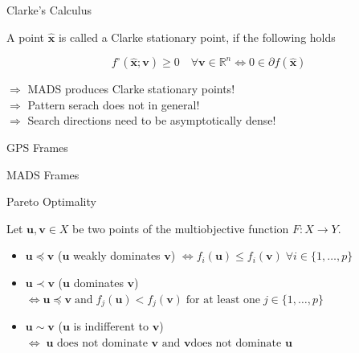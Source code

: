\documentclass[aspectratio=43,t]{beamer}
\renewcommand{\vec}[1]{\mathbf{#1}}
\begin{document}
	\begin{frame}[fragile]{Clarke's Calculus}
		\begin{definition}
        \label{def:stationary_clarke}
        A point $\vec{\hat{x}}$ is called a Clarke stationary point,
        if the following holds
        
        \begin{equation}
            f^{\circ}(\vec{\hat{x}}; \vec{v}) \geq 0 \quad \forall
             \vec{v} \in \mathbb{R}^n
            \Longleftrightarrow
            0 \in \partial f(\vec{\hat{x}})
        \end{equation}
    	\end{definition}

		$\Rightarrow$ MADS produces Clarke stationary points!\\
		\bigskip
		$\Rightarrow$ Pattern serach does not in general!\\
		\bigskip
		$\Rightarrow$ Search directions need to be asymptotically dense!\\
	\end{frame}
	
	\begin{frame}[fragile]{GPS Frames}
	\begin{figure}
    \centering
    \end{figure}
	\end{frame}

	\begin{frame}[fragile]{MADS Frames}
    \begin{figure}
    \centering
    \end{figure}

	\end{frame}

	\begin{frame}[fragile]{Pareto Optimality}
	\begin{definition}
        \label{def:pareto_dominance}
        Let $\vec{u},\vec{v} \in X$ be two points of the multiobjective
        function $F: X \rightarrow Y$.
        \begin{itemize}
            \item $\vec{u} \preceq \vec{v}$ ($\vec{u}$ weakly dominates $\vec{v}$)
            $\Longleftrightarrow f_i(\vec{u}) \leq f_i(\vec{v}) \; \forall i \in \{1,\dots,p\}$   

            \item $\vec{u} \prec \vec{v}$ ($\vec{u}$ dominates $\vec{v}$)
            $\Longleftrightarrow \vec{u} \preceq \vec{v} \; \text{and} \; 
            f_j(\vec{u}) < f_j(\vec{v}) \; \text{for at least one} \; j \in \{1,\dots,p\}$   

            \item $\vec{u} \sim \vec{v}$ ($\vec{u}$ is indifferent to $\vec{v}$)
            $\Longleftrightarrow \; \text{$\vec{u}$ does not dominate $\vec{v}$ and $\vec{v}$
            does not dominate $\vec{u}$}$  
        \end{itemize}
    \end{definition}
	\end{frame}
\end{document}
